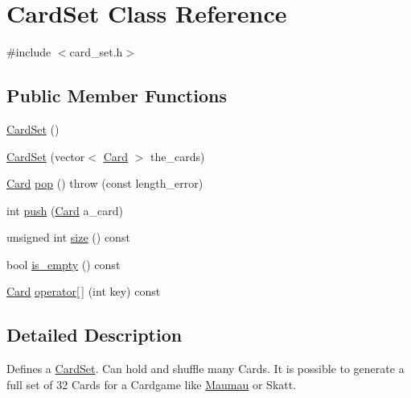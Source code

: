\hypertarget{classCardSet}{\section{Card\-Set Class Reference}
\label{classCardSet}
}


{\ttfamily \#include $<$card\-\_\-set.\-h$>$}

\subsection*{Public Member Functions}
\begin{DoxyCompactItemize}
\item 
\hyperlink{classCardSet_a82dc37ef37b0d105c127867e54e2525b}{Card\-Set} ()
\item 
\hyperlink{classCardSet_af10c8b44b0656576ffb3d30fbbf3e71e}{Card\-Set} (vector$<$ \hyperlink{classCard}{Card} $>$ the\-\_\-cards)
\item 
\hyperlink{classCard}{Card} \hyperlink{classCardSet_a92f9ade94cb375071dc1d70bad30cfb8}{pop} ()  throw (const length\-\_\-error)
\item 
int \hyperlink{classCardSet_affac0be4909c208a8aaf1fdbd395e880}{push} (\hyperlink{classCard}{Card} a\-\_\-card)
\item 
unsigned int \hyperlink{classCardSet_a59679da36decf7ed8d7a03a9737d3f58}{size} () const 
\item 
bool \hyperlink{classCardSet_ac1afa16d3795f3d120074b8e30276b77}{is\-\_\-empty} () const 
\item 
\hyperlink{classCard}{Card} \hyperlink{classCardSet_ae80f4625bb6f1d53dacdab2de02c4925}{operator\mbox{[}$\,$\mbox{]}} (int key) const 
\end{DoxyCompactItemize}


\subsection{Detailed Description}
Defines a \hyperlink{classCardSet}{Card\-Set}. Can hold and shuffle many Cards. It is possible to generate a full set of 32 Cards for a Cardgame like \hyperlink{classMaumau}{Maumau} or Skatt. 

